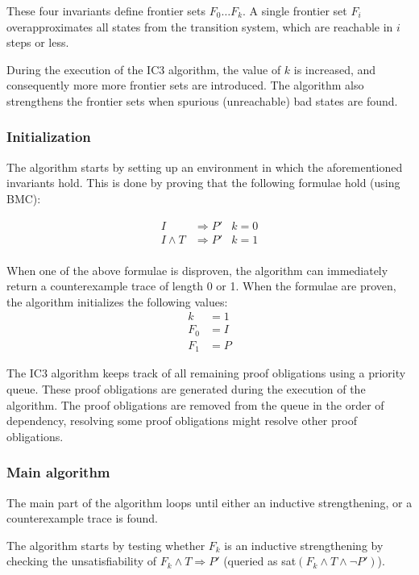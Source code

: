 \documentclass[a4paper]{article}
\begin{document}
These four invariants define frontier sets $F_0 \ldots F_k$. A single frontier set $F_i$ overapproximates all states from the transition system, which are reachable in $i$ steps or less.

During the execution of the IC3 algorithm, the value of $k$ is increased, and consequently more more frontier sets are introduced. The algorithm also strengthens the frontier sets when spurious (unreachable) bad states are found.

\subsubsection{Initialization}
The algorithm starts by setting up an environment in which the aforementioned invariants hold. This is done by proving that the following formulae hold (using BMC):

\begin{align*}
I&\Rightarrow P' & k=0\\
I \land T &\Rightarrow P' & k=1\\
\end{align*}

When one of the above formulae is disproven, the algorithm can immediately return a counterexample trace of length 0 or 1. When the formulae are proven, the algorithm initializes the following values:
\begin{align*}
k &= 1\\
F_0 &= I\\
F_1 &= P
\end{align*}

The IC3 algorithm keeps track of all remaining proof obligations using a priority queue. These proof obligations are generated during the execution of the algorithm. The proof obligations are removed from the queue in the order of dependency, resolving some proof obligations might resolve other proof obligations.

\subsubsection{Main algorithm}
The main part of the algorithm loops until either an inductive strengthening, or a counterexample trace is found.

The algorithm starts by testing whether $F_k$ is an inductive strengthening by checking the unsatisfiability of $F_k \land T \Rightarrow P'$ (queried as sat$(F_k \land T \land \lnot P')$).
\end{document}
